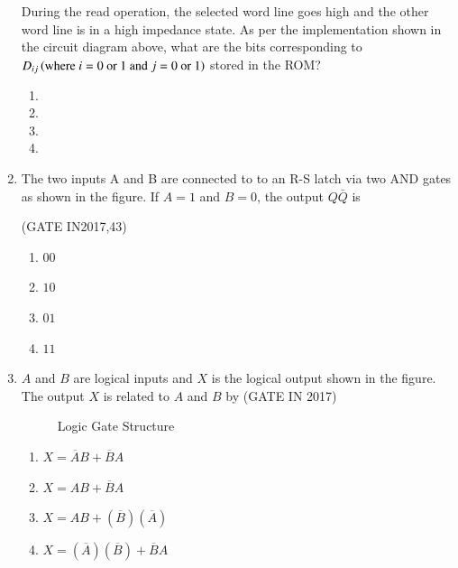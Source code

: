 \begin{enumerate}
		During the read operation, the selected word line goes high and the other word line is in a high impedance state. As per the implementation shown in the circuit diagram above, what are the bits corresponding to $D_{ij}\left(\text{where $i=0$ or $1$ and $j=0$ or $1$}\right)$ stored in the ROM?
\begin{enumerate}
    \item {}
    \item {}
    \item {}    
    \item {}
\end{enumerate}

\item The two inputs A and B are connected to to an R-S latch via two AND gates as shown in the figure. If $A=1$ and $B=0$, the output $Q\bar{Q}$ is
    \begin{figure}[H]
        \centering
        
       \end{figure}
       \hfill(GATE IN2017,43)
    \begin{enumerate}
   		\item $00$ 
   		\item $10$ 
   		\item $01$ 
   		\item $11$ 
   
   \end{enumerate}
\item $A$ and $B$ are logical inputs and $X$ is the logical output shown in the figure. The output $X$ is related to $A$ and $B$ by \hfill{(GATE IN 2017)}
\begin{figure}[H]
\centering

\label{fig:gate_in_2017_30}
\caption{Logic Gate Structure}
\end{figure}
\begin{enumerate}[label=\Alph*.]
\item $X = \overline{A}B + \overline{B}A$
\item $X = AB + \overline{B}A$
\item $X = AB + (\overline{B})(\overline{A})$
\item $X = (\overline{A})(\overline{B}) + \overline{B}A$
\end{enumerate}



\end{enumerate}
